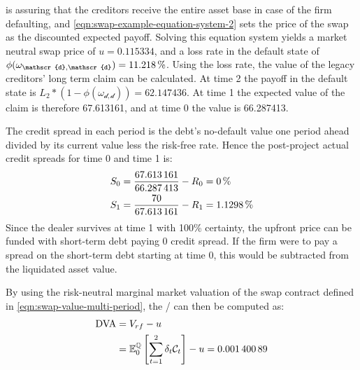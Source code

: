 \documentclass[main.tex]{subfiles}
\begin{document}
             is assuring that the creditors receive the entire asset base in case of the firm defaulting,
            and \cref{eqn:swap-example-equation-system-2} sets the price of the swap as the discounted expected payoff.
            Solving this equation system yields a market neutral swap price of $u=\num{0.115334}$,
            and a loss rate in the default state of 
            $\phi(\omega_{\mathscr{d},\mathscr{d}})=\pct{0.11218}$.
            Using the loss rate, the value of the legacy creditors' long term claim can be calculated.
            At time 2 the payoff in the default state is 
            $L_{2}*(1-\phi(\omega_{\mathscr{d},\mathscr{d}})) = \num{62.147436}$.
            At time 1 the expected value of the claim is therefore \num{67.613161},
            and at time 0 the value is \num{66.287413}.

            The credit spread in each period is the debt's no-default value one period ahead
            divided by its current value less the risk-free rate.
            Hence the post-project actual credit spreads for time 0 and time 1 is:
            \begin{align}
                S_{0} 
                &=
                \frac{
                    \num{67.613161}
                }{
                    \num{66.287413}
                }
                -
                R_{0}
                =
                \pct{0}
                \\
                S_{1} 
                &= 
                \frac{
                    \num{70}
                }{
                    \num{67.613161}
                } 
                -
                R_{1}
                =
                \pct{0.011298}
            \end{align}
            Since the dealer survives at time 1 with 100\% certainty,
            the upfront price can be funded with short-term debt paying 0 credit spread.
            If the firm were to pay a spread on the short-term debt starting at time 0,
            this would be subtracted from the liquidated asset value. 

            By using the risk-neutral marginal market valuation of the swap contract
            defined in \cref{eqn:swap-value-multi-period},
            the \DVA/ can then be computed as:
            \begin{align}
                \DVA/ &= V_{rf} - u
                \nonumber
                \\
                &= \mathbb{E}_{0}^{\rnmeasure}\left[\sum_{t=1}^{2}\delta_t \mathcal{C}_t\right] - u
                = \num{0.00140089}
            \end{align}
\end{document}
